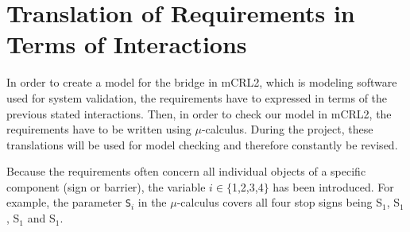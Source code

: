 \section{Translation of Requirements in Terms of Interactions}
\label{sec:trans}

In order to create a model for the bridge in mCRL2, which is modeling software used for system validation, the requirements have to expressed in terms of the previous stated interactions. Then, in order to check our model in mCRL2, the requirements have to be written using $\mu$-calculus. During the project, these translations will be used for model checking and therefore constantly be revised.

Because the requirements often concern all individual objects of a specific component (sign or barrier), the variable $i \in \{$1,2,3,4$\}$ has been introduced. For example, the parameter \texttt{S$_i$} in the $\mu$-calculus covers all four stop signs being S$_1$, S$_1$, S$_1$ and S$_1$.
%
